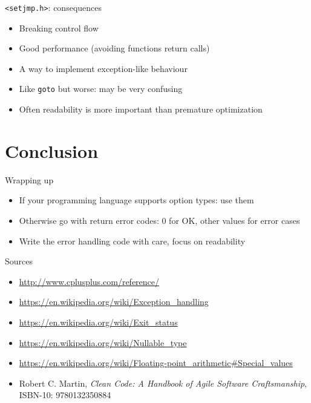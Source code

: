 \documentclass[aspectratio=169,14pt]{beamer}
\begin{document}
\begin{frame}{\texttt{<setjmp.h>}: consequences}
\begin{itemize}
    \item[\good] Breaking control flow
    \item[\good] Good performance (avoiding functions return calls)
    \item[\good] A way to implement exception-like behaviour
    \item[\bad] Like \texttt{goto} but worse: may be very confusing
    \item[\bad] Often readability is more important than premature optimization
\end{itemize}
\end{frame}





\section{Conclusion}

\begin{frame}{Wrapping up}
\begin{itemize}
    \item If your programming language supports option types: use them
    \item Otherwise go with return error codes: 0 for OK, other values for error cases
    \item Write the error handling code with care, focus on readability
\end{itemize}
\end{frame}



\begin{frame}{Sources}
\begin{small}
    \begin{itemize}
        \item \url{http://www.cplusplus.com/reference/}
        \item \url{https://en.wikipedia.org/wiki/Exception_handling}
        \item \url{https://en.wikipedia.org/wiki/Exit_status}
        \item \url{https://en.wikipedia.org/wiki/Nullable_type}
        \item \url{https://en.wikipedia.org/wiki/Floating-point_arithmetic\#Special_values}
        \item Robert C. Martin, \textit{Clean Code: A Handbook of Agile Software Craftsmanship}, ISBN-10: 9780132350884 
    \end{itemize}
\end{small}
\end{frame}



\end{document}
